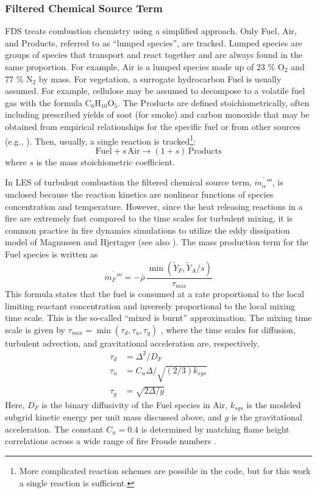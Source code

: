 \documentclass[journal,article,atmosphere,submit,moreauthors,pdftex]{Definitions_Review_Process/mdpi}
\renewcommand{\C}{\mathrm{C}}
\renewcommand{\H}{\mathrm{H}}
\renewcommand{\O}{\mathrm{O}}
\begin{document}
\subsubsection{Filtered Chemical Source Term}

FDS treats combustion chemistry using a simplified approach.  Only Fuel, Air, and Products, referred to as ``lumped species'', are tracked.  Lumped species are groups of species that transport and react together and are always found in the same proportion.  For example, Air is a lumped species made up of 23 \% O$_2$ and 77 \% N$_2$ by mass.  For vegetation, a surrogate hydrocarbon Fuel is usually assumed.  For example, cellulose may be assumed to decompose to a volatile fuel gas with the formula $\C_{6} \H_{10} \O_{5}$.  The Products are defined stoichiometrically, often including prescribed yields of soot (for smoke) and carbon monoxide that may be obtained from empirical relationships for the specific fuel or from other sources (e.g., \cite{SFPE:Mulholland}).  Then, usually, a single reaction is tracked\footnote{More complicated reaction schemes are possible in the code, but for this work a single reaction is sufficient.}:
\begin{equation}
\mathrm{Fuel} + s \, \mathrm{Air} \rightarrow (1+s) \,\mathrm{Products}
\end{equation}
where $s$ is the mass stoichiometric coefficient.  

In LES of turbulent combustion the filtered chemical source term, $\overline{\dot{m}_\alpha'''}$, is unclosed because the reaction kinetics are nonlinear functions of species concentration and temperature.  However, since the heat releasing reactions in a fire are extremely fast compared to the time scales for turbulent mixing, it is common practice in fire dynamics simulations to utilize the eddy dissipation model of Magnussen and Hjertager \cite{Magnussen:1} (see also \cite{Poinsot:TNC}).  The mass production term for the Fuel species is written as
\begin{equation}
\overline{\dot{m}_{F}'''} = -\bar{\rho} \,\frac{\min(\tilde{Y}_F,\tilde{Y}_A/s)}{\tau_{mix}}
\end{equation}
This formula states that the fuel is consumed at a rate proportional to the local limiting reactant concentration and inversely proportional to the local mixing time scale.  This is the so-called ``mixed is burnt'' approximation.  The mixing time scale is given by $\tau_{mix} = \min(\tau_d, \tau_u,\tau_g)$ \cite{McDermott:2011}, where the time scales for diffusion, turbulent advection, and gravitational acceleration are, respectively,
\begin{align}
\tau_d &= \Delta^2/D_F \\
\tau_u &= C_u \Delta / \sqrt{(2/3)k_{sgs}} \\
\tau_g &= \sqrt{2\Delta/g}
\end{align}
Here, $D_F$ is the binary diffusivity of the Fuel species in Air, $k_{sgs}$ is the modeled subgrid kinetic energy per unit mass discussed above, and $g$ is the gravitational acceleration. The constant $C_u=0.4$ is determined by matching flame height correlations across a wide range of fire Froude numbers \cite{FDS_Validation_Guide}.
\end{document}
